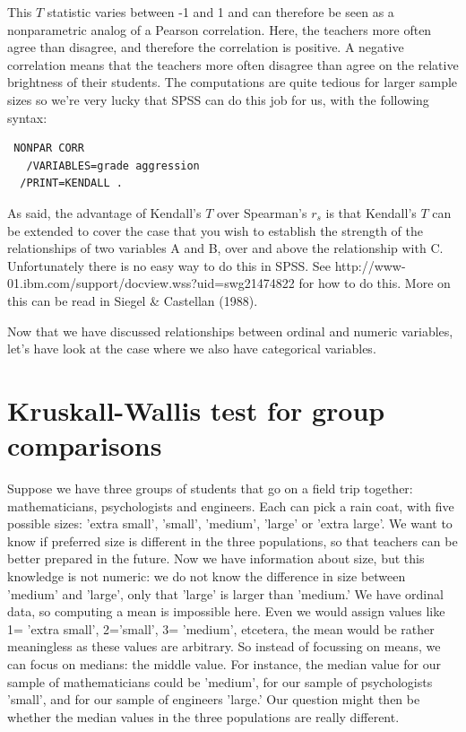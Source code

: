 \documentclass[]{book}\usepackage[]{graphicx}\usepackage[]{color}
\begin{document}
This $T$ statistic varies between -1 and 1 and can therefore be seen as a nonparametric analog of a Pearson correlation. Here, the teachers more often agree than disagree, and therefore the correlation is positive. A negative correlation means that the teachers more often disagree than agree on the relative brightness of their students. 
The computations are quite tedious for larger sample sizes so we're very lucky that SPSS can do this job for us, with the following syntax:


 \begin{verbatim}
 NONPAR CORR 
   /VARIABLES=grade aggression 
  /PRINT=KENDALL .
 \end{verbatim}


As said, the advantage of Kendall's $T$ over Spearman's $r_s$ is that Kendall's $T$ can be extended to cover the case that you wish to establish the strength of the relationships of two variables A and B, over and above the relationship with C. Unfortunately there is no easy way to do this in SPSS. See http://www-01.ibm.com/support/docview.wss?uid=swg21474822 for how to do this. More on this can be read in Siegel \& Castellan (1988).

        
Now that we have discussed relationships between ordinal and numeric variables, let's have look at the case where we also have categorical variables.


\section{Kruskall-Wallis test for group comparisons}


Suppose we have three groups of students that go on a field trip together: mathematicians, psychologists and engineers. Each can pick a rain coat, with five possible sizes: 'extra small', 'small', 'medium', 'large' or 'extra large'. We want to know if preferred size is different in the three populations, so that teachers can be better prepared in the future. Now we have information about size, but this knowledge is not numeric: we do not know the difference in size between 'medium' and 'large', only that 'large' is larger than 'medium.' We have ordinal data, so computing a mean is impossible here. Even we would assign values like 1= 'extra small', 2='small', 3= 'medium', etcetera, the mean would be rather meaningless as these values are arbitrary. So instead of focussing on means, we can focus on medians: the middle value. For instance, the median value for our sample of mathematicians could be 'medium', for our sample of psychologists 'small', and for our sample of engineers 'large.' Our question might then be whether the median values in the three populations are really different. 
\end{document}
